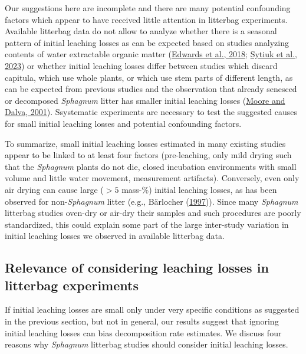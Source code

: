 \documentclass[
  12pt,
]{article}
\begin{document}
Our suggestions here are incomplete and there are many potential confounding factors which appear to have received little attention in litterbag experiments. Available litterbag data do not allow to analyze whether there is a seasonal pattern of initial leaching losses as can be expected based on studies analyzing contents of water extractable organic matter (\protect\hyperlink{ref-Edwards.2018}{Edwards et al., 2018}; \protect\hyperlink{ref-Sytiuk.2023}{Sytiuk et al., 2023}) or whether initial leaching losses differ between studies which discard capitula, which use whole plants, or which use stem parts of different length, as can be expected from previous studies and the observation that already senesced or decomposed \emph{Sphagnum} litter has smaller initial leaching losses (\protect\hyperlink{ref-Moore.2001}{Moore and Dalva, 2001}). Ssystematic experiments are necessary to test the suggested causes for small initial leaching losses and potential confounding factors.

To summarize, small initial leaching losses estimated in many existing studies appear to be linked to at least four factors (pre-leaching, only mild drying such that the \emph{Sphagnum} plants do not die, closed incubation environments with small volume and little water movement, measurement artifacts). Conversely, even only air drying can cause large (\(>5\) mass-\%) initial leaching losses, as has been observed for non-\emph{Sphagnum} litter (e.g., Bärlocher (\protect\hyperlink{ref-Barlocher.1997}{1997})). Since many \emph{Sphagnum} litterbag studies oven-dry or air-dry their samples and such procedures are poorly standardized, this could explain some part of the large inter-study variation in initial leaching losses we observed in available litterbag data.











\hypertarget{out-discussion-3}{%
\subsection{Relevance of considering leaching losses in litterbag experiments}\label{out-discussion-3}}

If initial leaching losses are small only under very specific conditions as suggested in the previous section, but not in general, our results suggest that ignoring initial leaching losses can bias decomposition rate estimates. We discuss four reasons why \emph{Sphagnum} litterbag studies should consider initial leaching losses.
\end{document}
